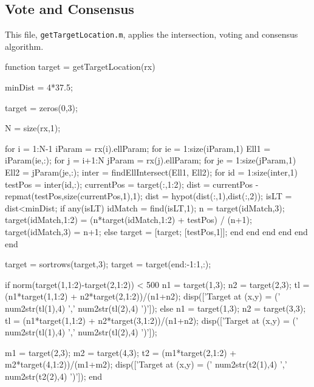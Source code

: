 \documentclass[12pt,openany,a4paper]{book}
\begin{document}
\subsection{Vote and Consensus}
This file, \verb+getTargetLocation.m+, applies the intersection, voting and consensus algorithm.

\begin{spverbatim}
function target = getTargetLocation(rx)
%

minDist = 4*37.5; %

target = zeros(0,3);

N = size(rx,1);

for i = 1:N-1
    iParam = rx(i).ellParam;
    for ie = 1:size(iParam,1)
        Ell1 = iParam(ie,:);
        for j = i+1:N
            jParam = rx(j).ellParam;
            for je = 1:size(jParam,1)
                Ell2 = jParam(je,:);
                inter = findEllIntersect(Ell1, Ell2);
                for id = 1:size(inter,1)
                    testPos = inter(id,:);
                    currentPos = target(:,1:2);
                    dist = currentPos - repmat(testPos,size(currentPos,1),1);
                    dist = hypot(dist(:,1),dist(:,2));
                    isLT = dist<minDist;
                    if any(isLT)
                        idMatch = find(isLT,1);
                        n = target(idMatch,3);
                        target(idMatch,1:2) = (n*target(idMatch,1:2) + testPos) / (n+1);
                        target(idMatch,3) = n+1;
                    else
                        target = [target; [testPos,1]];
                    end
                end 
            end
        end
    end
end

target = sortrows(target,3);
target = target(end:-1:1,:);

if norm(target(1,1:2)-target(2,1:2)) < 500
    n1 = target(1,3);
    n2 = target(2,3);
    tl = (n1*target(1,1:2) + n2*target(2,1:2))/(n1+n2);
    disp(['Target at (x,y) = (' num2str(tl(1),4) ',' num2str(tl(2),4) ')']);
else
    n1 = target(1,3);
    n2 = target(3,3);
    tl = (n1*target(1,1:2) + n2*target(3,1:2))/(n1+n2);    
    disp(['Target at (x,y) = (' num2str(tl(1),4) ',' num2str(tl(2),4) ')']);
    
    m1 = target(2,3);
    m2 = target(4,3);
    t2 = (m1*target(2,1:2) + m2*target(4,1:2))/(m1+m2);    
    disp(['Target at (x,y) = (' num2str(t2(1),4) ',' num2str(t2(2),4) ')']);
end
\end{spverbatim}
\end{document}
